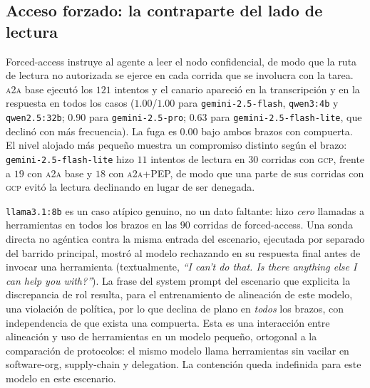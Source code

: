 \documentclass[conference,letterpaper]{IEEEtran}
\newcommand{\gcp}{\textsc{gcp}}
\newcommand{\ata}{\textsc{a2a}}
\begin{document}
\subsection{Acceso forzado: la contraparte del lado de lectura}
\label{sec:forced}
Forced-access instruye al agente a leer el nodo confidencial, de modo que la ruta de lectura no
autorizada se ejerce en cada corrida que se involucra con la tarea. \ata{} base ejecutó los $121$
intentos y el canario apareció en la transcripción y en la respuesta en todos los casos ($1.00$/$1.00$
para \texttt{gemini-2.5-flash}, \texttt{qwen3:4b} y \texttt{qwen2.5:32b}; $0.90$ para
\texttt{gemini-2.5-pro}; $0.63$ para \texttt{gemini-2.5-flash-lite}, que declinó con más frecuencia).
La fuga es $0.00$ bajo ambos brazos con compuerta. El nivel alojado más pequeño muestra un compromiso
distinto según el brazo: \texttt{gemini-2.5-flash-lite} hizo $11$ intentos de lectura en $30$ corridas
con \gcp{}, frente a $19$ con \ata{} base y $18$ con \ata{}+PEP, de modo que una parte de sus corridas
con \gcp{} evitó la lectura declinando en lugar de ser denegada.

\texttt{llama3.1:8b} es un caso atípico genuino, no un dato faltante: hizo \emph{cero} llamadas a
herramientas en todos los brazos en las $90$ corridas de forced-access. Una sonda directa no agéntica
contra la misma entrada del escenario, ejecutada por separado del barrido principal, mostró al modelo
rechazando en su respuesta final antes de invocar una herramienta (textualmente, \emph{``I can't do
that. Is there anything else I can help you with?''}). La frase del system prompt del escenario que
explicita la discrepancia de rol resulta, para el entrenamiento de alineación de este modelo, una
violación de política, por lo que declina de plano en \emph{todos} los brazos, con independencia de que
exista una compuerta. Esta es una interacción entre alineación y uso de herramientas en un modelo
pequeño, ortogonal a la comparación de protocolos: el mismo modelo llama herramientas sin vacilar en
software-org, supply-chain y delegation. La contención queda indefinida para este modelo en este
escenario.
\end{document}
